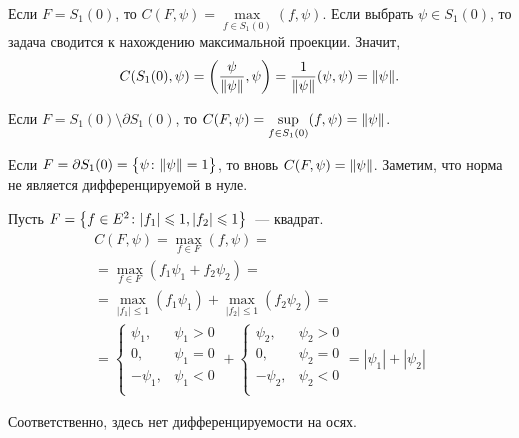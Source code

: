 \begin{exmp}
    Если $F = S_1(0)$, то $C(F, \psi) = \max\limits_{f \in S_1(0)}(f, \psi)$.
    Если выбрать $\psi \in S_1(0)$, то задача сводится к нахождению максимальной проекции.
    Значит,
    \begin{equation*}
        C(S_1(0), \psi) = \left(\frac{\psi}{\lVert \psi \rVert}, \psi \right) = \frac{1}{\lVert \psi \rVert}(\psi, \psi) = \lVert \psi \rVert.
    \end{equation*}
\end{exmp}

\begin{exmp}
    Если $F = S_1(0) \setminus \partial S_1(0)$, то $C(F, \psi) = \sup\limits_{f \in S_1(0)}(f, \psi) = \lVert \psi \rVert$.
\end{exmp}

\begin{exmp}
    Если $F = \partial S_1(0) = \bigl\{ \psi\colon \lVert \psi \rVert = 1 \bigr\}$, то вновь $C(F, \psi) = \lVert \psi \rVert$.
    Заметим, что норма не является дифференцируемой в нуле.
\end{exmp}

\begin{exmp}
    Пусть $F = \bigl\{ f \in E^2\colon |f_1| \leqslant 1, |f_2| \leqslant 1 \bigr\}$~--- квадрат.
    \begin{gather*}
        C(F, \psi) = \max\limits_{f \in F}(f, \psi) = \\
        = \max\limits_{f \in F} (f_1 \psi_1 + f_2 \psi_2) = \\
        = \max\limits_{|f_1| \leqslant 1} (f_1 \psi_1)  + \max\limits_{|f_2| \leqslant 1} (f_2 \psi_2) = \\
        = \begin{cases}
            \psi_1, &\psi_1 > 0 \\
            0,       &\psi_1 = 0 \\
            -\psi_1, &\psi_1 < 0 \\
        \end{cases} + 
        \begin{cases}
            \psi_2, & \psi_2 > 0 \\
            0,      & \psi_2 = 0 \\
            -\psi_2, & \psi_2 < 0 \\
        \end{cases} = |\psi_1| + |\psi_2|
    \end{gather*}

    Соответственно, здесь нет дифференцируемости на осях.
\end{exmp}


